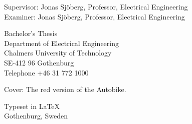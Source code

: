 Supervisor: Jonas Sjöberg, Professor, Electrical Engineering\\
Examiner: Jonas Sjöberg, Professor, Electrical Engineering \setlength{\parskip}{1cm}

Bachelor's Thesis \the\year\\	
Department of Electrical Engineering\\
Chalmers University of Technology\\
SE-412 96 Gothenburg\\
Telephone +46 31 772 1000 \setlength{\parskip}{0.5cm}

\vfill
Cover: The red version of the Autobike. \setlength{\parskip}{0.5cm}

Typeset in \LaTeX \tagtemp\\
Gothenburg, Sweden \the\year
